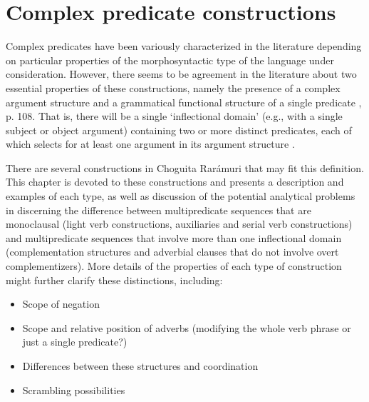 \chapter{Complex predicate constructions}
\label{chap: complex predicate constructions}

Complex predicates have been variously characterized in the literature depending on particular properties of the morphosyntactic type of the language under consideration. However, there seems to be agreement in the literature about two essential properties of these constructions, namely the presence of a complex argument structure and a grammatical functional structure of a single predicate \citep{butt1995structure}, p. 108. That is, there will be a single ‘inflectional domain’ (e.g., with a single subject or object argument) containing two or more distinct predicates, each of which selects for at least one argument in its argument structure \citep[247]{baker1997thematic}.

There are several constructions in Choguita Rarámuri that may fit this definition. This chapter is devoted to these constructions and presents a description and examples of each type, as well as discussion of the potential analytical problems in discerning the difference between multipredicate sequences that are monoclausal (light verb constructions, auxiliaries and serial verb constructions) and multipredicate sequences that involve more than one inflectional domain (complementation structures and adverbial clauses that do not involve overt complementizers). More details of the properties of each type of construction might further clarify these distinctions, including:

\begin{itemize}
\item Scope of negation
\item Scope and relative position of adverbs (modifying the whole verb phrase or just a single predicate?)
\item Differences between these structures and coordination
\item Scrambling possibilities
\end{itemize}



